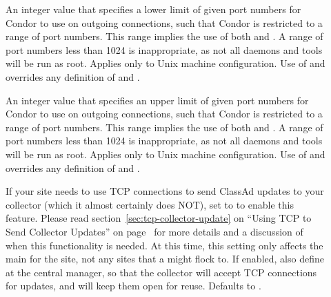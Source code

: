 \begin{description}
\item[] \label{param:OutLowPort}
  An integer value that specifies a lower limit of given port numbers
  for Condor to use on outgoing connections,
  such that Condor is restricted to a range of port numbers.
  This range implies the use of both  and
  .
  A range of port numbers less than 1024 is inappropriate, as
  not all daemons and tools will be run as root.
  Applies only to Unix machine configuration.
  Use of  and  overrides
  any definition of  and .

\item[] \label{param:OutHighPort}
  An integer value that specifies an upper limit of given port numbers
  for Condor to use on outgoing connections,
  such that Condor is restricted to a range of port numbers.
  This range implies the use of both  and
  .
  A range of port numbers less than 1024 is inappropriate, as
  not all daemons and tools will be run as root.
  Applies only to Unix machine configuration.
  Use of  and  overrides
  any definition of  and .

\item[]
  \label{param:UpdateCollectorWithTcp}
  If your site needs to use TCP connections to send ClassAd updates to
  your collector (which it almost certainly does NOT), set to 
  to enable this feature.
  Please read section~\ref{sec:tcp-collector-update} on ``Using TCP to
  Send Collector Updates'' on page~\pageref{sec:tcp-collector-update}
  for more details and a discussion of when this
  functionality is needed. 
  At this time, this setting only affects the main 
  for the site, not any sites that a  might flock to. 
  If enabled, also define
   at the central manager, so
  that the collector will accept TCP connections for updates, and will
  keep them open for reuse.
  Defaults to .


\end{description}

